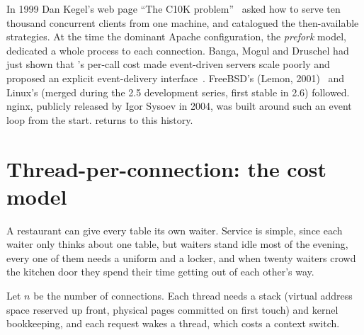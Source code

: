 \begin{history}
In 1999 Dan Kegel's web page ``The C10K problem''~\cite{kegel1999c10k} asked how to serve ten thousand concurrent clients
from one machine, and catalogued the then-available strategies. At the time the dominant Apache configuration,
the \emph{prefork} model, dedicated a whole process to each connection. Banga, Mogul and Druschel had just shown that
's per-call cost made event-driven servers scale poorly and proposed an explicit event-delivery
interface~\cite{banga1999scalable}. FreeBSD's  (Lemon, 2001)~\cite{lemon2001kqueue} and Linux's 
(merged during the 2.5 development series, first stable in 2.6) followed. nginx, publicly released by Igor Sysoev in 2004,
was built around such an event loop from the start.  returns to this history.
\end{history}

\section{Thread-per-connection: the cost model}\label{sec:tpc}
\begin{layman}
A restaurant can give every table its own waiter. Service is simple, since each waiter only thinks about one table, but
waiters stand idle most of the evening, every one of them needs a uniform and a locker, and when twenty waiters crowd the
kitchen door they spend their time getting out of each other's way.
\end{layman}

Let $n$ be the number of connections. Each thread needs a stack (virtual address space reserved up front, physical
pages committed on first touch) and kernel bookkeeping, and each request wakes a thread, which costs a context switch.


